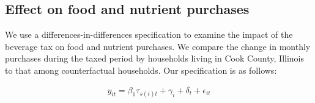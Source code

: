 \documentclass[12pt]{article}
\begin{document}
%
%
%

\subsection{Effect on food and nutrient purchases}

We use a differences-in-differences specification to examine the impact of the beverage tax on food and nutrient purchases. We compare the change in monthly purchases during the taxed period by households living in Cook County, Illinois to that among counterfactual households. Our specification is as follows:

\begin{align}
	y_{it} = \beta_1 \tau_{s(i)t} + \gamma_i + \delta_t + \epsilon_{it} \label{spec_did}
\end{align}
\end{document}
